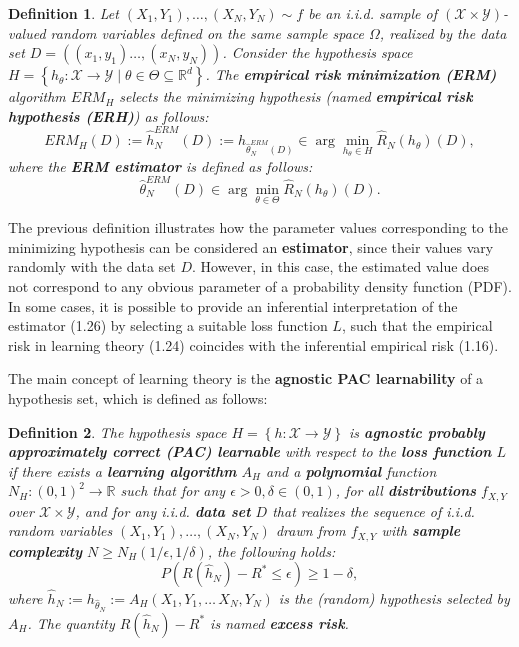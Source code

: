 \documentclass{report}
\newtheorem{definition}{Definition}[chapter]
\begin{document}
\begin{definition}
Let $(X_1, Y_1),\dots,(X_N, Y_N) \sim f$ be an i.i.d. sample of $(\mathcal{X} \times \mathcal{Y})$-valued random variables defined on the same sample space $\Omega$, realized by the data set $D =((x_1, y_1)\dots,(x_N,y_N))$. Consider the hypothesis space $H = \left\{h_\theta : \mathcal{X} \to \mathcal{Y} \mid\theta\in\Theta\subseteq\mathbb{R}^d\right\}$. The \textbf{empirical risk minimization (ERM)} algorithm $ERM_H$ selects the minimizing hypothesis (named \textbf{empirical risk hypothesis (ERH)}) as follows:
\begin{equation}
ERM_H(D) := \hat{h}_N^{ERM}(D) := h_{\hat{\theta}^{ERM}_N(D)} \in \arg \min_{h_\theta \in H} \hat{R}_N(h_\theta)(D),
\end{equation}
where the \textbf{ERM estimator} is defined as follows:
\begin{equation}
\hat{\theta}^{ERM}_N(D) \in \arg\min_{\theta \in \Theta}\hat{R}_N(h_\theta)(D).
\end{equation}
\end{definition}

The previous definition illustrates how the parameter values corresponding to the minimizing hypothesis can be considered an \textbf{estimator}, since their values vary randomly with the data set $D$. However, in this case, the estimated value does not correspond to any obvious parameter of a probability density function (PDF). In some cases, it is possible to provide an inferential interpretation of the estimator (1.26) by selecting a suitable loss function $L$, such that the empirical risk in learning theory (1.24) coincides with the inferential empirical risk (1.16).

The main concept of learning theory is the \textbf{agnostic PAC learnability} of a hypothesis set, which is defined as follows:

\begin{definition}
The hypothesis space $H = \left\{h : \mathcal{X} \to \mathcal{Y}\right\}$ is \textbf{agnostic probably approximately correct (PAC) learnable} with respect to the \textbf{loss function} $L$ if there exists a \textbf{learning algorithm} $A_H$ and a \textbf{polynomial} function $N_H : (0,1) ^2 \to \mathbb{R}$ such that for any $\epsilon > 0,\delta \in (0,1)$, for all \textbf{distributions} $f_{X,Y}$ over $\mathcal{X} \times \mathcal{Y}$, and for any i.i.d. \textbf{data set} $D$ that realizes the sequence of i.i.d. random variables $(X_1, Y_1),\dots,(X_N, Y_N)$ drawn from $f_{X,Y}$ with \textbf{sample complexity} $N\geq N_H(1/\epsilon,1/\delta)$, the following holds:
\begin{equation}
P\left(R(\hat{h}_N) - R^* \leq \epsilon\right) \geq 1- \delta,
\end{equation}
where $\hat{h}_N := h_{\hat{\theta}_N} := A_H(X_1, Y_1,\dots\,X_N, Y_N)$ is the (random) hypothesis selected by $A_H$. The quantity $R(\hat{h}_N) - R^*$ is named \textbf{excess risk}.
\end{definition}
\end{document}
